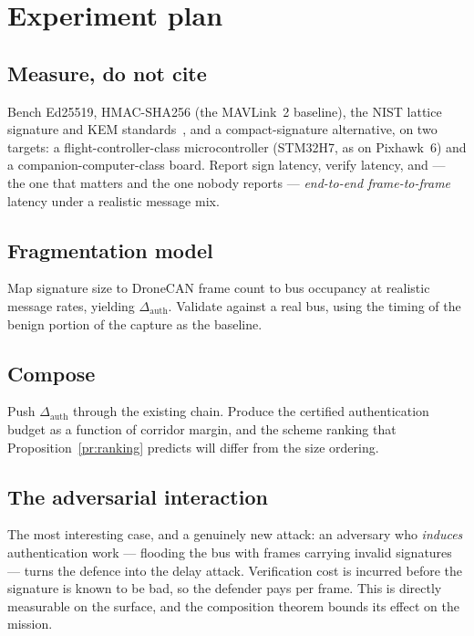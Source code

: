 \documentclass[11pt,a4paper]{article}
\begin{document}
\section{Experiment plan}
\subsection{Measure, do not cite}
Bench Ed25519, HMAC-SHA256 (the MAVLink~2 baseline), the NIST lattice signature
and KEM standards~\cite{nist_pqc}, and a compact-signature alternative, on two
targets: a flight-controller-class microcontroller (STM32H7, as on Pixhawk~6)
and a companion-computer-class board. Report sign latency, verify latency, and
--- the one that matters and the one nobody reports --- \emph{end-to-end
frame-to-frame} latency under a realistic message mix.

\subsection{Fragmentation model}
Map signature size to DroneCAN frame count to bus occupancy at realistic message
rates, yielding $\Delta_{\mathrm{auth}}$. Validate against a real bus, using the
timing of the benign portion of the  capture as the
baseline.

\subsection{Compose}
Push $\Delta_{\mathrm{auth}}$ through the existing chain. Produce the certified
authentication budget as a function of corridor margin, and the scheme ranking
that Proposition~\ref{pr:ranking} predicts will differ from the size ordering.

\subsection{The adversarial interaction}
The most interesting case, and a genuinely new attack: an adversary who
\emph{induces} authentication work --- flooding the bus with frames carrying
invalid signatures --- turns the defence into the delay attack. Verification
cost is incurred before the signature is known to be bad, so the defender pays
per frame. This is directly measurable on the  surface, and the
composition theorem bounds its effect on the mission.
\end{document}
